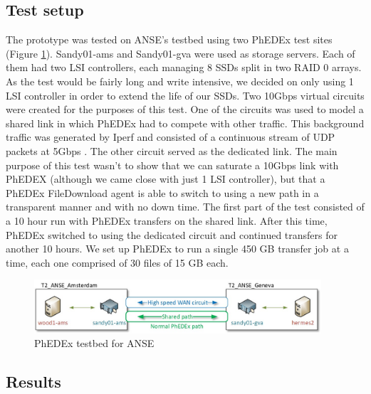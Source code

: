 \subsection{Test setup}

The prototype was tested on ANSE's testbed using two PhEDEx test sites (Figure \ref{fig:ANSE-setup}).
Sandy01-ams and Sandy01-gva were used as storage servers. Each of them had two LSI controllers, each
managing 8 SSDs split in two RAID 0 arrays. As the test would be fairly long and write intensive,
we decided on only using 1 LSI controller in order to extend the life of our SSDs.
Two 10Gbps virtual circuits were created for the purposes of this test.
One of the circuits was used to model a shared link in which PhEDEx had to compete with other
traffic. This background traffic was generated by Iperf and consisted of a continuous stream of
UDP packets at 5Gbps . The other circuit served as the dedicated link.
The main purpose of this test wasn't to show that we can saturate a 10Gbps link with PhEDEX
(although we came close with just 1 LSI controller), but that a PhEDEx FileDownload agent is able
to switch to using a new path in a transparent manner and with no down time.
The first part of the test consisted of a 10 hour run with PhEDEx transfers on the shared link. After
this time, PhEDEx switched to using the dedicated circuit and continued transfers for another 10
hours. We set up PhEDEx to run a single 450 GB transfer job at a time, each one comprised of 30
files of 15 GB each.

\begin{figure}[h]
  \centering
  \includegraphics[width=0.95\textwidth]{Figures/FileDownload_ANSE_Testbed.jpg}
  \caption{PhEDEx testbed for ANSE}
  \label{fig:ANSE-setup}
\end{figure}

\subsection{Results}

